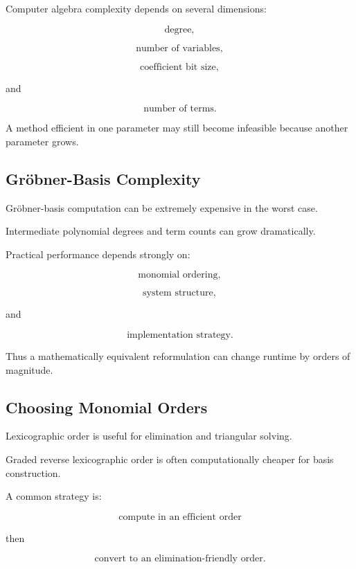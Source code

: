 Computer algebra complexity depends on several dimensions:

\[
\boxed{
\text{degree},
}
\]

\[
\boxed{
\text{number of variables},
}
\]

\[
\boxed{
\text{coefficient bit size},
}
\]

and

\[
\boxed{
\text{number of terms}.
}
\]

A method efficient in one parameter may still become infeasible because
another parameter grows.

\subsection{Gröbner-Basis Complexity}
\label{subsec:groebner-complexity}

Gröbner-basis computation can be extremely expensive in the worst case.

Intermediate polynomial degrees and term counts can grow dramatically.

Practical performance depends strongly on:

\[
\boxed{
\text{monomial ordering},
}
\]

\[
\boxed{
\text{system structure},
}
\]

and

\[
\boxed{
\text{implementation strategy}.
}
\]

Thus a mathematically equivalent reformulation can change runtime by orders
of magnitude.

\subsection{Choosing Monomial Orders}
\label{subsec:choosing-monomial-orders}

Lexicographic order is useful for elimination and triangular solving.

Graded reverse lexicographic order is often computationally cheaper for
basis construction.

A common strategy is:

\[
\boxed{
\text{compute in an efficient order}
}
\]

then

\[
\boxed{
\text{convert to an elimination-friendly order}.
}
\]

